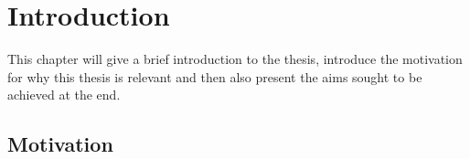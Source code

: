 \chapter{Introduction}

This chapter will give a brief introduction to the thesis, introduce the motivation for why this thesis is relevant and then also present the aims sought to be achieved at the end.

\section{Motivation}










